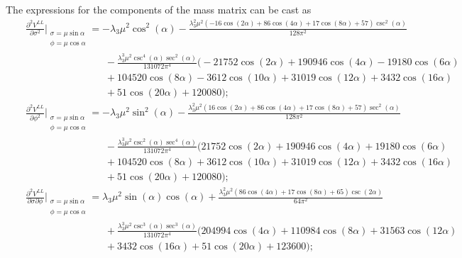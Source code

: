 \documentclass[11pt,a4paper,english,superscriptaddress,preprint,aps,prd]{revtex4}
\begin{document}
The expressions for the components of the mass matrix can be cast as
\begin{subequations}\label{components-mass-L2}
 \begin{eqnarray}
  &&\frac{\partial^2 V^{LL}}{\partial \sigma^2}\Bigr |_{\substack{\sigma=\mu\sin\alpha\\\phi=\mu\cos\alpha}} = -\lambda_3 \mu ^2 \cos ^2(\alpha )-\frac{\lambda_3^2 \mu ^2 (-16 \cos (2 \alpha )+86 \cos (4 \alpha )+17 \cos (8 \alpha )+57) \csc ^2(\alpha )}{128 \pi ^2}\nonumber\\
  &&\qquad\qquad\qquad\qquad-\frac{\lambda_3^3 \mu ^2 \csc ^4(\alpha ) \sec ^2(\alpha )}{131072 \pi ^4} \Bigr(-21752 \cos (2 \alpha )+190946 \cos (4 \alpha )-19180 \cos (6 \alpha )\nonumber\\
  &&\qquad\qquad\qquad\qquad+104520 \cos (8 \alpha )-3612 \cos (10 \alpha )+31019 \cos (12 \alpha )+3432 \cos (16 \alpha )\nonumber\\
  &&\qquad\qquad\qquad\qquad+51 \cos (20 \alpha )+120080\Bigr);\\
  &&\frac{{\partial^2 V^{LL}}}{\partial \phi^2}\Bigr |_{\substack{\sigma=\mu\sin\alpha\\\phi=\mu\cos\alpha}} = -\lambda_3 \mu ^2 \sin ^2(\alpha )-\frac{\lambda_3^2 \mu ^2 (16 \cos (2 \alpha )+86 \cos (4 \alpha )+17 \cos (8 \alpha )+57) \sec ^2(\alpha )}{128 \pi ^2}\nonumber\\
  &&\qquad\qquad\qquad\qquad-\frac{\lambda_3^3 \mu ^2 \csc ^2(\alpha ) \sec ^4(\alpha )}{131072 \pi ^4} (21752 \cos (2 \alpha )+190946 \cos (4 \alpha )+19180 \cos (6 \alpha )\nonumber\\
  &&\qquad\qquad\qquad\qquad+104520 \cos (8 \alpha )+3612 \cos (10 \alpha )+31019 \cos (12 \alpha )+3432 \cos (16 \alpha )\nonumber\\
  &&\qquad\qquad\qquad\qquad+51 \cos (20 \alpha )+120080);\\
  && \frac{\partial^2 V^{LL}}{\partial \sigma\partial\phi}\Bigr |_{\substack{\sigma=\mu\sin\alpha\\\phi=\mu\cos\alpha}} = \lambda_3 \mu ^2 \sin (\alpha ) \cos (\alpha )+\frac{\lambda_3^2 \mu ^2 (86 \cos (4 \alpha )+17 \cos (8 \alpha )+65) \csc (2 \alpha )}{64 \pi ^2}\nonumber\\
  &&\qquad\qquad\qquad\qquad+\frac{\lambda_3^3 \mu ^2\csc ^3(\alpha ) \sec ^3(\alpha )}{131072 \pi ^4} (204994 \cos (4 \alpha )+110984 \cos (8 \alpha )+31563 \cos (12 \alpha )\nonumber\\
  &&\qquad\qquad\qquad\qquad+3432 \cos (16 \alpha )+51 \cos (20 \alpha )+123600);\\

\end{eqnarray}
\end{subequations}
\end{document}
